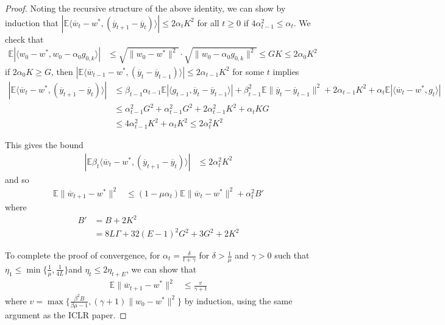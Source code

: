 \begin{proof}
	Noting the recursive structure of the above identity, we can show
	by induction that $|\mathbb{E}\langle\overline{w}_{t}-w^{\ast},(\overline{y}_{t+1}-\overline{y}_{t})\rangle|\leq2\alpha_{t}K^{2}$\textbf{
	}for all $t\geq0$ if $4\alpha_{t-1}^{2}\leq\alpha_{t}$. We check
	that 
	\begin{align*}
	\mathbb{E}|\langle w_{0}-w^{\ast},w_{0}-\alpha_{0}g_{0,k}\rangle| & \leq\sqrt{\|w_{0}-w^{\ast}\|^{2}}\cdot\sqrt{\|w_{0}-\alpha_{0}g_{0,k}\|^{2}}\leq GK\leq2\alpha_{0}K^{2}
	\end{align*}
	if $2\alpha_{0}K\geq G$, then $|\mathbb{E}\langle\overline{w}_{t-1}-w^{\ast},(\overline{y}_{t}-\overline{y}_{t-1})\rangle|\leq2\alpha_{t-1}K^{2}$
	for some $t$ implies 
	\begin{align*}
	|\mathbb{E}\langle\overline{w}_{t}-w^{\ast},(\overline{y}_{t+1}-\overline{y}_{t})\rangle| & \leq\beta_{t-1}\alpha_{t-1}\mathbb{E}|\langle g_{t-1},\overline{y}_{t}-\overline{y}_{t-1}\rangle|+\beta_{t-1}^{2}\mathbb{E}\|\overline{y}_{t}-\overline{y}_{t-1}\|^{2}+2\alpha_{t-1}K^{2}+\alpha_{t}\mathbb{E}|\langle\overline{w}_{t}-w^{\ast},g_{t}\rangle|\\
	& \leq\alpha_{t-1}^{2}G^{2}+\alpha_{t-1}^{2}G^{2}+2\alpha_{t-1}^{2}K^{2}+\alpha_{t}KG\\
	& \leq4\alpha_{t-1}^{2}K^{2}+\alpha_{t}K^{2}\leq2\alpha_{t}^{2}K^{2}
	\end{align*}
	
	This gives the bound
	\begin{align*}
	|\mathbb{E}\beta_{t}\langle\overline{w}_{t}-w^{\ast},(\overline{y}_{t+1}-\overline{y}_{t})\rangle| & \leq2\alpha_{t}^{2}K^{2}
	\end{align*}
	and so
	\begin{align*}
	\mathbb{E}\|\overline{w}_{t+1}-w^{\ast}\|^{2} & \leq(1-\mu\alpha_{t})\mathbb{E}\|\overline{w}_{t}-w^{\ast}\|^{2}+\alpha_{t}^{2}B'
	\end{align*}
	where 
	\begin{align*}
	B' & =B+2K^{2}\\
	& =8L\Gamma+32(E-1)^{2}G^{2}+3G^{2}+2K^{2}
	\end{align*}
	
	To complete the proof of convergence, for $\alpha_{t}=\frac{\delta}{t+\gamma}$
	for $\delta>\frac{1}{\mu}$ and $\gamma>0$ such that $\eta_{1}\leq\min\{\frac{1}{\mu},\frac{1}{4L}\}$and
	$\eta_{t}\leq2\eta_{t+E}$, we can show that 
	\begin{align*}
	\mathbb{E}\|\overline{w}_{t+1}-w^{\ast}\|^{2} & \leq\frac{v}{\gamma+t}
	\end{align*}
	where $v=\max\{\frac{\beta^{2}B}{\beta\mu-1},(\gamma+1)\|w_{0}-w^{\ast}\|^{2}\}$
	by induction, using the same argument as the ICLR paper. 
\end{proof}
